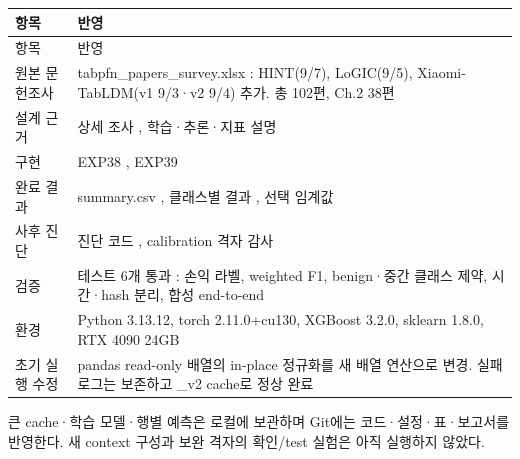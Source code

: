 \begin{longtable}{>{\raggedright\arraybackslash}p{}>{\raggedright\arraybackslash}p{}}
\toprule
항목 & 반영 \\ \midrule
\endfirsthead
항목 & 반영 \\ \midrule
\endhead
{}원본 문헌조사 & tabpfn\_\allowbreak{}papers\_\allowbreak{}survey.xlsx : HINT(9/\allowbreak{}7), LoGIC(9/\allowbreak{}5), Xiaomi-TabLDM(v1 9/\allowbreak{}3·v2 9/\allowbreak{}4) 추가. 총 102편, Ch.2 38편 \\
{}설계 근거 & 상세 조사 , 학습·추론·지표 설명 \\
{}구현 & EXP38 , EXP39 \\
{}완료 결과 & summary.csv , 클래스별 결과 , 선택 임계값 \\
{}사후 진단 & 진단 코드 , calibration 격자 감사 \\
{}검증 & 테스트 6개 통과 : 손익 라벨, weighted F1, benign·중간 클래스 제약, 시간·hash 분리, 합성 end-to-end \\
{}환경 & Python 3.13.12, torch 2.11.0+\allowbreak{}cu130, XGBoost 3.2.0, sklearn 1.8.0, RTX 4090 24GB \\
{}초기 실행 수정 & pandas read-only 배열의 in-place 정규화를 새 배열 연산으로 변경. 실패 로그는 보존하고 \_\allowbreak{}v2 cache로 정상 완료 \\
\bottomrule
\end{longtable}
\endgroup
큰 cache·학습 모델·행별 예측은 로컬에 보관하며 Git에는 코드·설정·표·보고서를 반영한다. 새 context 구성과 보완 격자의 확인/\allowbreak{}test 실험은 아직 실행하지 않았다.

